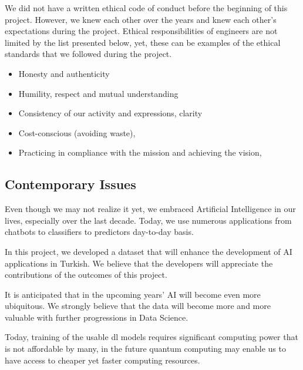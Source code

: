 \documentclass{mefsdp}
\begin{document}
	We did not have a written ethical code of conduct before the beginning of this project. However, we knew each other over the years and knew each other's expectations during the project.
	Ethical responsibilities of engineers are not limited by the list presented below, yet, these can be examples of the ethical standards that we followed during the project.
	
	\begin{itemize}
		\item	Honesty and authenticity
		\item	Humility, respect and mutual understanding
		\item	Consistency of our activity and expressions, clarity
		\item	Cost-conscious (avoiding waste),
		\item	Practicing in compliance with the mission and achieving the vision,
	\end{itemize}
	
	
	\subsection{Contemporary Issues}
	
	Even though we may not realize it yet, we embraced Artificial Intelligence in our lives, especially over the last decade. Today, we use numerous applications from chatbots to classifiers to predictors day-to-day basis. \newline \par
	
	In this project, we developed a dataset that will enhance the development of AI applications in Turkish. We believe that the developers will appreciate the contributions of the outcomes of this project. \newline \par
	
	It is anticipated that in the upcoming years' AI will become even more ubiquitous. We strongly believe that the data will become more and more valuable with further progressions in Data Science. \newline \par
	
	Today, training of the usable \gls{dl} models requires significant computing power that is not affordable by many, in the future quantum computing may enable us to have access to cheaper yet faster computing resources. \newline \par
	
\end{document}
